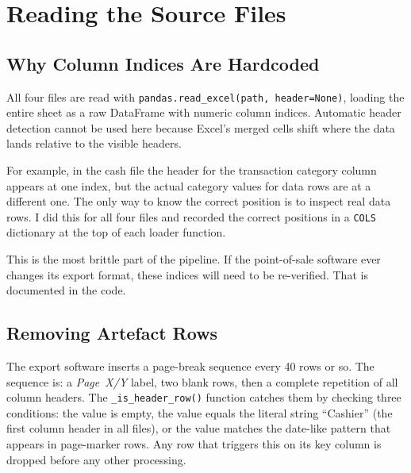 \documentclass[12pt, a4paper]{report}
\begin{document}

\section{Reading the Source Files}

\subsection{Why Column Indices Are Hardcoded}

All four files are read with \texttt{pandas.read\_excel(path, header=None)}, loading
the entire sheet as a raw DataFrame with numeric column indices. Automatic header
detection cannot be used here because Excel's merged cells shift where the data
lands relative to the visible headers.

For example, in the cash file the header for the transaction category column appears
at one index, but the actual category values for data rows are at a different one.
The only way to know the correct position is to inspect real data rows. I did this
for all four files and recorded the correct positions in a \texttt{COLS} dictionary
at the top of each loader function.

This is the most brittle part of the pipeline. If the point-of-sale software ever
changes its export format, these indices will need to be re-verified. That is
documented in the code.

\subsection{Removing Artefact Rows}

The export software inserts a page-break sequence every 40 rows or so. The sequence
is: a \textit{Page~X/Y} label, two blank rows, then a complete repetition of all
column headers. The \texttt{\_is\_header\_row()} function catches them by checking
three conditions: the value is empty, the value equals the literal string
``Cashier'' (the first column header in all files), or the value matches the
date-like pattern that appears in page-marker rows. Any row that triggers this on
its key column is dropped before any other processing.
\end{document}
